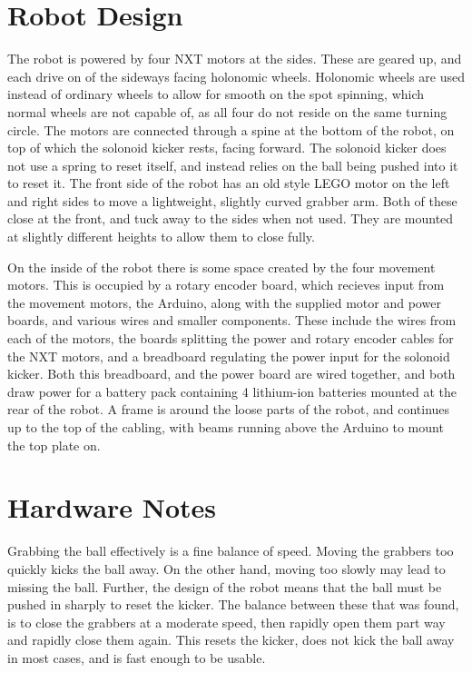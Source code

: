 \section{Robot Design}

The robot is powered by four NXT motors at the sides. These are geared up, and
each drive on of the sideways facing holonomic wheels. Holonomic wheels are
used instead of ordinary wheels to allow for smooth on the spot spinning, which
normal wheels are not capable of, as all four do not reside on the same turning
circle. The motors are connected through a spine at the bottom of the robot,
on top of which the solonoid kicker rests, facing forward. The solonoid kicker
does not use a spring to reset itself, and instead relies on the ball being
pushed into it to reset it. The front side of the robot has an old style LEGO
motor on the left and right sides to move a lightweight, slightly curved
grabber arm. Both of these close at the front, and tuck away to the sides when
not used. They are mounted at slightly different heights to allow them to close
fully.

On the inside of the robot there is some space created by the four movement
motors. This is occupied by a rotary encoder board, which recieves input from
the movement motors, the Arduino, along with the supplied motor and power
boards, and various wires and smaller components. These include the wires from
each of the motors, the boards splitting the power and rotary encoder cables
for the NXT motors, and a breadboard regulating the power input for the
solonoid kicker. Both this breadboard, and the power board are wired together,
and both draw power for a battery pack containing 4 lithium-ion batteries
mounted at the rear of the robot. A frame is around the loose parts of the
robot, and continues up to the top of the cabling, with beams running above the
Arduino to mount the top plate on.

\section{Hardware Notes}

Grabbing the ball effectively is a fine balance of speed. Moving the grabbers
too quickly kicks the ball away. On the other hand, moving too slowly may lead
to missing the ball. Further, the design of the robot means that the ball must
be pushed in sharply to reset the kicker. The balance between these that was
found, is to close the grabbers at a moderate speed, then rapidly open them
part way and rapidly close them again. This resets the kicker, does not kick
the ball away in most cases, and is fast enough to be usable.

